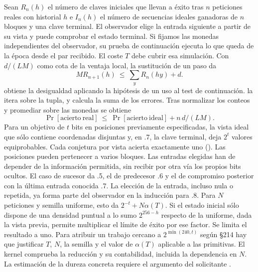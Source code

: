 Sean \(R_n(h)\) el número de claves iniciales que llevan a éxito tras
\(n\) peticiones reales con historial \(h\) e \(I_n(h)\) el número de
secuencias ideales ganadoras de \(n\) bloques y una clave terminal.
El observador elige la entrada siguiente a partir de su vista y puede
comprobar el estado terminal. Si fijamos las monedas independientes del
observador, su prueba de continuación ejecuta lo que queda de la época
desde el par recibido. El coste \(T\) debe cubrir esa simulación. Con
\(d/(LM)\) como cota de la ventaja local, la sustitución de un paso da
\[
  M R_{n+1}(h)\ \le\ \sum_y R_n(hy)+d .
\]
 obtiene la desigualdad aplicando la hipótesis
de un uso al test de continuación.  la itera sobre
la tupla, y  calcula la suma de los errores. Tras
normalizar los conteos y promediar sobre las monedas se obtiene
\[
  \Pr[\mathrm{acierto\ real}]\ \le\
  \Pr[\mathrm{acierto\ ideal}] + n\,d/(LM).
\]
Para un objetivo de \(t\) bits en posiciones previamente especificadas, la
vista ideal que sólo contiene coordenadas disjuntas y, en .7, la clave
terminal, deja \(2^t\) valores equiprobables. Cada conjetura por vista
acierta exactamente uno (). Las posiciones pueden
pertenecer a varios bloques. Las entradas elegidas han de depender de la
información permitida, sin recibir por otra vía los propios bits ocultos.
El caso de sucesor da .5, el de predecesor .6 y el de compromiso posterior
con la última entrada conocida .7. La elección de la entrada, incluso nula
o repetida, ya forma parte del observador en la inducción para .8.
Para \(N\) peticiones y semilla uniforme, esto da \(2^{-t}+N\alpha(T)\).
Si el estado inicial sólo dispone de una densidad puntual a lo sumo
\(2^{256-h}\) respecto de la uniforme, dada la vista previa,
 permite multiplicar el límite de éxito por
ese factor. Se limita el resultado a uno. Para atribuir un trabajo
cercano a \(2^{\min(240,t)}\) según §214 hay que justificar \(T\),
\(N\), la semilla y el valor de \(\alpha(T)\) aplicable a las primitivas.
El kernel comprueba la reducción y su contabilidad, incluida la dependencia
en \(N\). La estimación de la dureza concreta requiere el argumento del
solicitante \cite[§§121--122, 211--214 y 998]{ais}.

